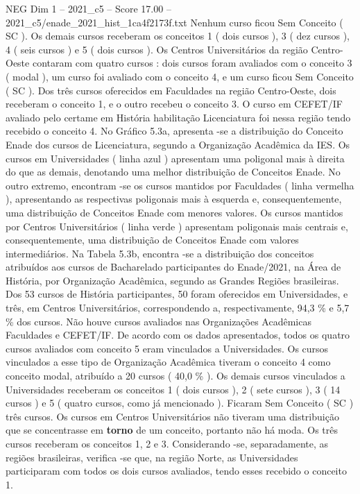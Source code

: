 \begin{textsample}{NEG Dim 1 – 2021\_c5 – Score 17.00 – 2021\_c5/enade\_2021\_hist\_1ca4f2173f.txt}
Nenhum curso ficou Sem Conceito ( SC ).
Os demais cursos receberam os conceitos 1 ( dois cursos ), 3 ( dez cursos ), 4 ( seis cursos ) e 5 ( dois cursos ).
Os Centros Universitários da região Centro-Oeste contaram com quatro cursos : dois cursos foram avaliados com o conceito 3 ( modal ), um curso foi avaliado com o conceito 4, e um curso ficou Sem Conceito ( SC ).
Dos três cursos oferecidos em Faculdades na região Centro-Oeste, dois receberam o conceito 1, e o outro recebeu o conceito 3.
O curso em CEFET/IF avaliado pelo certame em História habilitação Licenciatura foi nessa região tendo recebido o conceito 4.
No Gráfico 5.3a, apresenta -se a distribuição do Conceito Enade dos cursos de Licenciatura, segundo a Organização Acadêmica da IES.
Os cursos em Universidades ( linha azul ) apresentam uma poligonal mais à direita do que as demais, denotando uma melhor distribuição de Conceitos Enade.
No outro extremo, encontram -se os cursos mantidos por Faculdades ( linha vermelha ), apresentando as respectivas poligonais mais à esquerda e, consequentemente, uma distribuição de Conceitos Enade com menores valores.
Os cursos mantidos por Centros Universitários ( linha verde ) apresentam poligonais mais centrais e, consequentemente, uma distribuição de Conceitos Enade com valores intermediários.
Na Tabela 5.3b, encontra -se a distribuição dos conceitos atribuídos aos cursos de Bacharelado participantes do Enade/2021, na Área de História, por Organização Acadêmica, segundo as Grandes Regiões brasileiras.
Dos 53 cursos de História participantes, 50 foram oferecidos em Universidades, e três, em Centros Universitários, correspondendo a, respectivamente, 94,3 \% e 5,7 \% dos cursos.
Não houve cursos avaliados nas Organizações Acadêmicas Faculdades e CEFET/IF.
De acordo com os dados apresentados, todos os quatro cursos avaliados com conceito 5 eram vinculados a Universidades.
Os cursos vinculados a esse tipo de Organização Acadêmica tiveram o conceito 4 como conceito modal, atribuído a 20 cursos ( 40,0 \% ).
Os demais cursos vinculados a Universidades receberam os conceitos 1 ( dois cursos ), 2 ( sete cursos ), 3 ( 14 cursos ) e 5 ( quatro cursos, como já mencionado ).
Ficaram Sem Conceito ( SC ) três cursos.
Os cursos em Centros Universitários não tiveram uma distribuição que se concentrasse em \textbf{torno} de um conceito, portanto não há moda.
Os três cursos receberam os conceitos 1, 2 e 3.
Considerando -se, separadamente, as regiões brasileiras, verifica -se que, na região Norte, as Universidades participaram com todos os dois cursos avaliados, tendo esses recebido o conceito 1.

\end{textsample}
